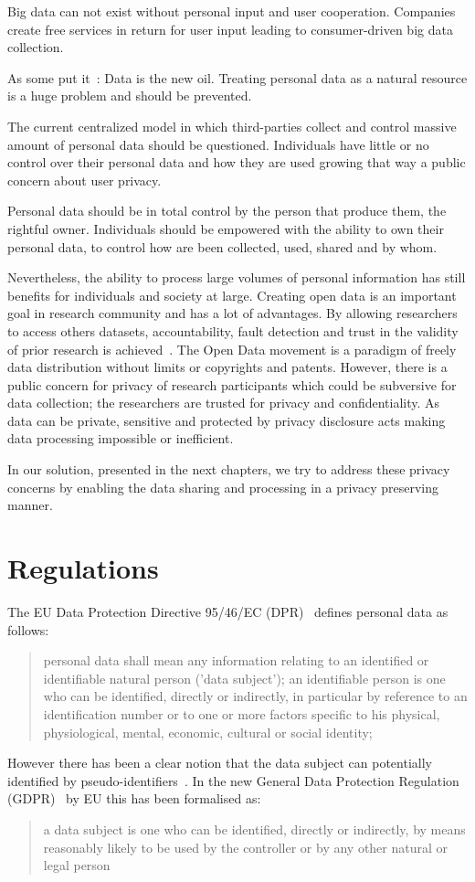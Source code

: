 Big data can not exist without personal input and user cooperation. Companies create free services in return for user input leading to consumer-driven big data collection.

As some put it~\cite{data_new_oil_01,data_new_oil_02,data_new_oil_03,data_new_oil_04,data_new_oil_05,data_new_oil_05,data_new_oil_06,data_new_oil_07,data_new_oil_08,data_new_oil_09}: Data is the new oil. Treating personal data as a natural resource is a huge problem and should be prevented.

The current centralized model in which third-parties collect and control massive amount of personal data should be questioned. Individuals have little or no control over their personal data and how they are used growing that way a public concern about user privacy.

Personal data should be in total control by the person that produce them, the rightful owner. Individuals should be empowered with the ability to own their personal data, to control how are been collected, used, shared and by whom.

Nevertheless, the ability to process large volumes of personal information has still benefits for individuals and society at large. Creating open data is an important goal in research community and has a lot of advantages. By allowing researchers to access others datasets, accountability, fault detection and trust in the validity of prior research is achieved~\cite{open_data_1}. The Open Data movement is a paradigm of freely data distribution without limits or copyrights and patents. However, there is a public concern for privacy of research participants which could be subversive for data collection; the researchers are trusted for privacy and confidentiality. As data can be private, sensitive and protected by privacy disclosure acts making data processing impossible or inefficient.

In our solution, presented in the next chapters, we try to address these privacy concerns by enabling the data sharing and processing in a privacy preserving manner.

\section{Regulations}\label{problem:regulations}

The EU Data Protection Directive 95/46/EC (DPR)~\cite{eu-46ec-1995} defines personal data as follows:
\blockquote{
personal data shall mean any information relating to an identified or identifiable natural person ('data subject'); an identifiable person is one who can be identified, directly or indirectly, in particular by reference to an identification number or to one or more factors specific to his physical, physiological, mental, economic, cultural or social identity;
}
However there has been a clear notion that the data subject can potentially identified by pseudo-identifiers~\cite{pii}.
In the new General Data Protection Regulation (GDPR)~\cite{gdpr} by EU this has been formalised as:
\blockquote{
a data subject is one who can be identified, directly or indirectly, by means reasonably likely to be used by the controller or by any other natural or legal person
}

